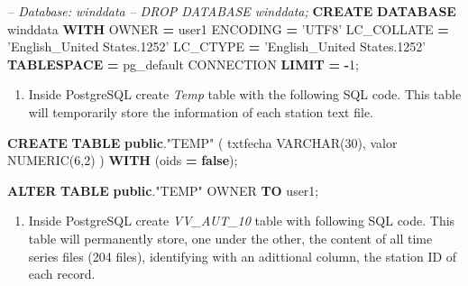 \documentclass[12pt,oneside]{reedthesis}
\newenvironment{Shaded}{\begin{snugshade}}{\end{snugshade}}
\newcommand{\CommentTok}[1]{\textcolor[rgb]{0.56,0.35,0.01}{\textit{#1}}}
\newcommand{\DataTypeTok}[1]{\textcolor[rgb]{0.13,0.29,0.53}{#1}}
\newcommand{\DecValTok}[1]{\textcolor[rgb]{0.00,0.00,0.81}{#1}}
\newcommand{\KeywordTok}[1]{\textcolor[rgb]{0.13,0.29,0.53}{\textbf{#1}}}
\newcommand{\NormalTok}[1]{#1}
\newcommand{\OperatorTok}[1]{\textcolor[rgb]{0.81,0.36,0.00}{\textbf{#1}}}
\newcommand{\OtherTok}[1]{\textcolor[rgb]{0.56,0.35,0.01}{#1}}
\newcommand{\StringTok}[1]{\textcolor[rgb]{0.31,0.60,0.02}{#1}}
\providecommand{\tightlist}{%
  \setlength{\itemsep}{0pt}\setlength{\parskip}{0pt}}
\begin{document}
\scriptsize

\vspace{0.4cm}
\begin{Shaded}
\begin{Highlighting}[]
        \CommentTok{-- Database: winddata}
        \CommentTok{-- DROP DATABASE winddata;}
        \KeywordTok{CREATE} \KeywordTok{DATABASE}\NormalTok{ winddata}
            \KeywordTok{WITH} 
\NormalTok{            OWNER }\OperatorTok{=}\NormalTok{ user1}
\NormalTok{            ENCODING }\OperatorTok{=} \StringTok{'UTF8'}
\NormalTok{            LC_COLLATE }\OperatorTok{=} \StringTok{'English_United States.1252'}
\NormalTok{            LC_CTYPE }\OperatorTok{=} \StringTok{'English_United States.1252'}
            \KeywordTok{TABLESPACE} \OperatorTok{=}\NormalTok{ pg_default}
\NormalTok{            CONNECTION }\KeywordTok{LIMIT} \OperatorTok{=} \OperatorTok{-}\DecValTok{1}\NormalTok{;}
\end{Highlighting}
\end{Shaded}
\normalsize
\begin{enumerate}
\def\labelenumi{\arabic{enumi}.}
\setcounter{enumi}{2}
\tightlist
\item
  Inside PostgreSQL create \emph{Temp} table with the following SQL code. This table will temporarily store the information of each station text file.
\end{enumerate}
\scriptsize

\vspace{0.4cm}
\begin{Shaded}
\begin{Highlighting}[]
        \KeywordTok{CREATE} \KeywordTok{TABLE} \KeywordTok{public}\NormalTok{.}\OtherTok{"TEMP"}\NormalTok{ (}
\NormalTok{          txtfecha }\DataTypeTok{VARCHAR}\NormalTok{(}\DecValTok{30}\NormalTok{),}
\NormalTok{          valor }\DataTypeTok{NUMERIC}\NormalTok{(}\DecValTok{6}\NormalTok{,}\DecValTok{2}\NormalTok{) ) }\KeywordTok{WITH}\NormalTok{ (oids }\OperatorTok{=} \KeywordTok{false}\NormalTok{);}
        
        \KeywordTok{ALTER} \KeywordTok{TABLE} \KeywordTok{public}\NormalTok{.}\OtherTok{"TEMP"}
\NormalTok{          OWNER }\KeywordTok{TO}\NormalTok{ user1;}
\end{Highlighting}
\end{Shaded}
\normalsize
\begin{enumerate}
\def\labelenumi{\arabic{enumi}.}
\setcounter{enumi}{3}
\tightlist
\item
  Inside PostgreSQL create \emph{VV\_AUT\_10} table with following SQL code. This table will permanently store, one under the other, the content of all time series files (204 files), identifying with an adittional column, the station ID of each record.
\end{enumerate}
\scriptsize
\end{document}
